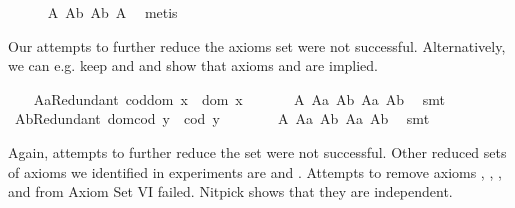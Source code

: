 \begin{isabellebody}
%
\isadelimproof
\ \ \ \ %
\endisadelimproof
%
\isatagproof
{}\isamarkupfalse%
\ A{}\ A{}b\ A{}b\ A{}\ \isamarkupfalse%
\ metis%
\endisatagproof
{\isafoldproof}%
%
\isadelimproof
%
\endisadelimproof
%
\begin{isamarkuptext}%
Our attempts to further reduce the axioms set   were not successful.
Alternatively, we can e.g. keep  and  and show that axioms  
and  are implied.%
\end{isamarkuptext}\isamarkuptrue%
\ \ \isamarkupfalse%
\ A{}aRedundant{\isacharcolon}\ {\isachardoublequoteopen}cod{\isacharparenleft}dom\ x{\isacharparenright}\ {\isasymcong}\ dom\ x{\isachardoublequoteclose}\ \isanewline
%
\isadelimproof
\ \ \ \ %
\endisadelimproof
%
\isatagproof
{}\isamarkupfalse%
\ A{}\ A{}a\ A{}b\ A{}a\ A{}b\ \isamarkupfalse%
\ smt%
\endisatagproof
{\isafoldproof}%
%
\isadelimproof
\isanewline
%
\endisadelimproof
\ \ \isamarkupfalse%
\ A{}bRedundant{\isacharcolon}\ {\isachardoublequoteopen}dom{\isacharparenleft}cod\ y{\isacharparenright}\ {\isasymcong}\ cod\ y{\isachardoublequoteclose}\ \isanewline
%
\isadelimproof
\ \ \ \ %
\endisadelimproof
%
\isatagproof
{}\isamarkupfalse%
\ \ A{}\ A{}a\ A{}b\ A{}a\ A{}b\ \isamarkupfalse%
\ smt%
\endisatagproof
{\isafoldproof}%
%
\isadelimproof
%
\endisadelimproof
%
\begin{isamarkuptext}%
Again, attempts to further reduce the set  were not successful.
   Other reduced sets of axioms we identified in experiments are  and
    . Attempts to remove axioms , , 
    , and  from Axiom Set VI failed. Nitpick shows that they are independent. 


\end{isamarkuptext}
\end{isabellebody}
